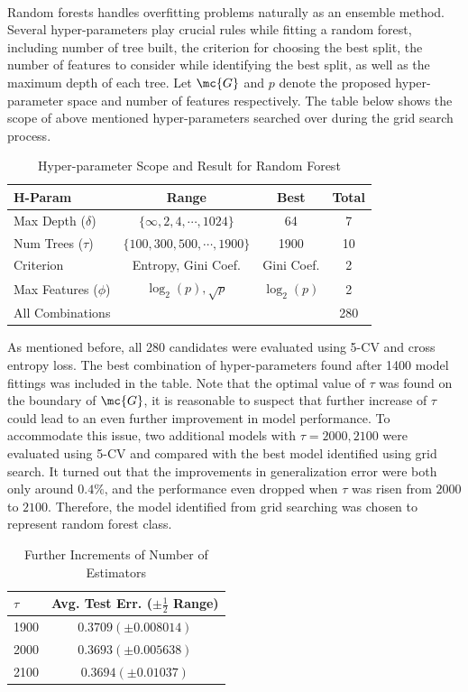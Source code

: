 \documentclass[11pt]{article}
\begin{document}
 	\paragraph{} Random forests handles overfitting problems naturally as an ensemble method. Several hyper-parameters play crucial rules while fitting a random forest, including number of tree built, the criterion for choosing the best split, the number of features to consider while identifying the best split, as well as the maximum depth of each tree. Let $\mc{G}$ and $p$ denote the proposed hyper-parameter space and number of features respectively. The table below shows the scope of above mentioned hyper-parameters searched over during the grid search process.
 	\begin{table}[H]
 		\centering
 		\begin{tabular}{l|c|c|c}
 		H-Param & Range & Best & Total \\
 		\hline
 		Max Depth ($\delta$) & $\{\infty, 2, 4, \cdots, 1024\}$ & 64 & 7 \\
 		Num Trees ($\tau$) & $\{100, 300, 500, \cdots, 1900\}$ & 1900 & 10 \\
 		Criterion & Entropy, Gini Coef. & Gini Coef. & 2 \\
 		Max Features ($\phi$) & $\log_2(p), \sqrt{p}$ & $\log_2(p)$ & 2\\
 		\hline 
 		All Combinations& & & 280
		\end{tabular}
		\caption{Hyper-parameter Scope and Result for Random Forest}
 	\end{table}
 	As mentioned before, all 280 candidates were evaluated using 5-CV and cross entropy loss. The best combination of hyper-parameters found after 1400 model fittings was included in the table. Note that the optimal value of $\tau$ was found on the boundary of $\mc{G}$, it is reasonable to suspect that further increase of $\tau$ could lead to an even further improvement in model performance. To accommodate this issue, two additional models with $\tau=2000, 2100$ were evaluated using 5-CV and compared with the best model identified using grid search. It turned out that the improvements in generalization error were both only around $0.4\%$, and the performance even dropped when $\tau$ was risen from $2000$ to $2100$. Therefore, the model identified from grid searching was chosen to represent random forest class.
 	
 	\begin{table}[H]
	 	\centering
		\begin{tabular}{l|c}
			$\tau$ & Avg. Test Err. ($\pm \frac{1}{2}$ Range) \\
			\hline
			1900 & $0.3709(\pm 0.008014)$ \\
			2000 & $0.3693(\pm 0.005638)$ \\
			2100 & $0.3694(\pm 0.01037)$ 
		\end{tabular}
		\caption{Further Increments of Number of Estimators}
	\end{table}
 
\end{document}
